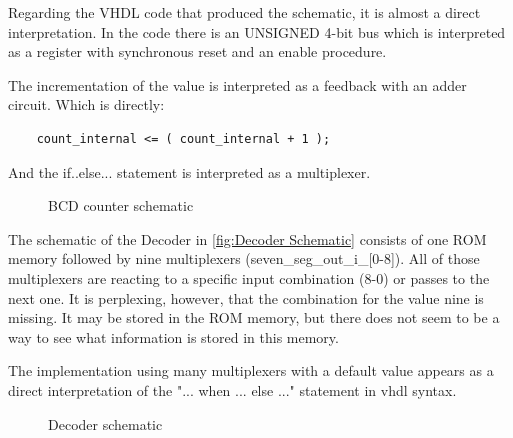\documentclass[10pt]{article}
\begin{document}
Regarding the VHDL code that produced the schematic, it is almost a direct interpretation. In the code there is an UNSIGNED 4-bit bus which is interpreted as a register with synchronous reset and an enable procedure. 

The incrementation of the value is interpreted as a feedback with an adder circuit. Which is directly:
\begin{verbatim}
    count_internal <= ( count_internal + 1 );
\end{verbatim}
And the if..else... statement is interpreted as a multiplexer.

\begin{figure}[ht]
    \centering
    \caption{BCD counter schematic}
    \label{fig:BCD Counter Schematic}
\end{figure}
\newpage

The schematic of the Decoder in \autoref{fig:Decoder Schematic} consists of one ROM memory followed by nine multiplexers (seven\_seg\_out\_i\_[0-8]). All of those multiplexers are reacting to a specific input combination (8-0) or passes to the next one. It is perplexing, however, that the combination for the value nine is missing. It may be stored in the ROM memory, but there does not seem to be a way to see what information is stored in this memory.

The implementation using many multiplexers with a default value appears as a direct interpretation of the "... when ... else ..." statement in vhdl syntax.

\begin{figure}[ht]
    \centering
    \caption{Decoder schematic}
    \label{fig:Decoder Schematic}
\end{figure}
\newpage
\end{document}
